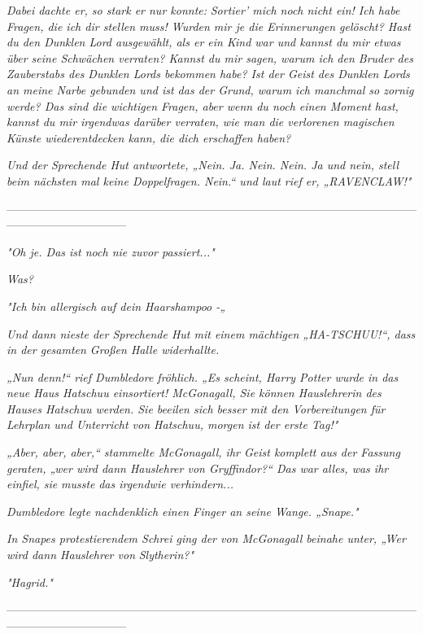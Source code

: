 {\emph{Dabei dachte er, so stark er nur konnte:} \emph{\emph{Sortier' mich noch nicht ein! Ich habe Fragen, die ich dir stellen muss! Wurden mir je die Erinnerungen gelöscht? Hast du den Dunklen Lord ausgewählt, als er ein Kind war und kannst du mir etwas über seine Schwächen verraten? Kannst du mir sagen, warum ich den Bruder des Zauberstabs des Dunklen Lords bekommen habe? Ist der Geist des Dunklen Lords an meine Narbe gebunden und ist das der Grund, warum ich manchmal so zornig werde? Das sind die wichtigen Fragen, aber wenn du noch einen Moment hast, kannst du mir irgendwas darüber verraten, wie man die verlorenen magischen Künste wiederentdecken kann, die dich erschaffen haben?}}

\emph{Und der Sprechende Hut antwortete, „\emph{Nein. Ja. Nein. Nein. Ja und nein, stell beim nächsten mal keine Doppelfragen. Nein.}“ und laut rief er, „RAVENCLAW!"}

--------------------------------------------------------------------------------------------------------------------------------------------

\hfill\break \emph{"\emph{Oh je. Das ist noch nie zuvor passiert...}"}

\emph{\emph{Was?}}

\emph{"\emph{Ich bin allergisch auf dein Haarshampoo -}„}

\emph{Und dann nieste der Sprechende Hut mit einem mächtigen „HA-TSCHUU!“, dass in der gesamten Großen Halle widerhallte.}

\emph{„Nun denn!“ rief Dumbledore fröhlich. „Es scheint, Harry Potter wurde in das neue Haus Hatschuu einsortiert! McGonagall, Sie können Hauslehrerin des Hauses Hatschuu werden. Sie beeilen sich besser mit den Vorbereitungen für Lehrplan und Unterricht von Hatschuu, morgen ist der erste Tag!"}

\emph{„Aber, aber, aber,“ stammelte McGonagall, ihr Geist komplett aus der Fassung geraten, „wer wird dann Hauslehrer von Gryffindor?“ Das war alles, was ihr einfiel, sie} \emph{\emph{musste}} \emph{das irgendwie verhindern...}

\emph{Dumbledore legte nachdenklich einen Finger an seine Wange. „Snape."}

\emph{In Snapes protestierendem Schrei ging der von McGonagall beinahe unter, „Wer wird dann Hauslehrer von} \emph{\emph{Slytherin?}"}

\emph{"Hagrid."}

--------------------------------------------------------------------------------------------------------------------------------------------

}
